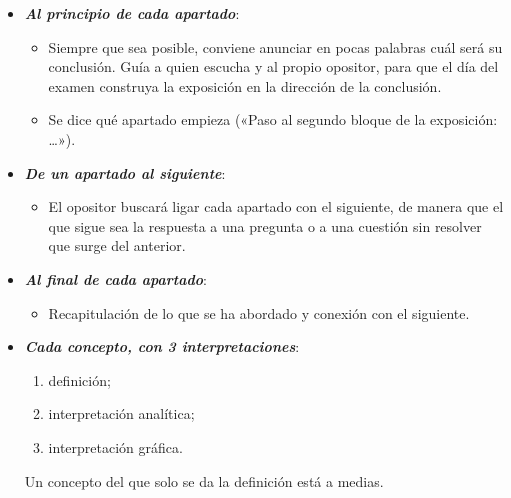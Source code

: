 \documentclass[11pt]{article}
\begin{document}
\begin{itemize}
\item \textbf{\emph{Al principio de cada apartado}}:
  \begin{itemize}
  \item Siempre que sea posible, conviene anunciar en pocas palabras cuál será su conclusión. Guía a quien escucha y al propio opositor, para que el día del examen construya la exposición en la dirección de la conclusión.
  \item Se dice qué apartado empieza («Paso al segundo bloque de la exposición: …»).
  \end{itemize}
\item \textbf{\emph{De un apartado al siguiente}}:
  \begin{itemize}
  \item El opositor buscará ligar cada apartado con el siguiente, de manera que el que sigue sea la respuesta a una pregunta o a una cuestión sin resolver que surge del anterior.
  \end{itemize}
\item \textbf{\emph{Al final de cada apartado}}:
  \begin{itemize}
  \item Recapitulación de lo que se ha abordado y conexión con el siguiente.
  \end{itemize}
\item \textbf{\emph{Cada concepto, con 3 interpretaciones}}:
  \begin{enumerate}
  \item definición;
  \item interpretación analítica;
  \item interpretación gráfica.
  \end{enumerate}
  Un concepto del que solo se da la definición está a medias.
\end{itemize}
\end{document}
